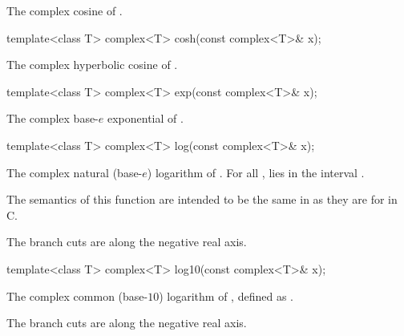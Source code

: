 \begin{itemdescr}
\pnum
\returns
The complex cosine of .
\end{itemdescr}

%
\begin{itemdecl}
template<class T> complex<T> cosh(const complex<T>& x);
\end{itemdecl}

\begin{itemdescr}
\pnum
\returns
The complex hyperbolic cosine of .
\end{itemdescr}

%
\begin{itemdecl}
template<class T> complex<T> exp(const complex<T>& x);
\end{itemdecl}

\begin{itemdescr}
\pnum
\returns
The complex base-$e$ exponential of .
\end{itemdescr}

%
\begin{itemdecl}
template<class T> complex<T> log(const complex<T>& x);
\end{itemdecl}

\begin{itemdescr}
\pnum
\returns
The complex natural (base-$e$) logarithm of . For all ,
 lies in the interval \crange{$-\pi$}{$\pi$}.
\begin{note}
The semantics of this function are intended to be the same in \Cpp{}
as they are for  in C.
\end{note}

\pnum
\remarks
The branch cuts are along the negative real axis.
\end{itemdescr}

%
\begin{itemdecl}
template<class T> complex<T> log10(const complex<T>& x);
\end{itemdecl}

\begin{itemdescr}
\pnum
\returns
The complex common (base-$10$) logarithm of , defined as
.

\pnum
\remarks
The branch cuts are along the negative real axis.
\end{itemdescr}


